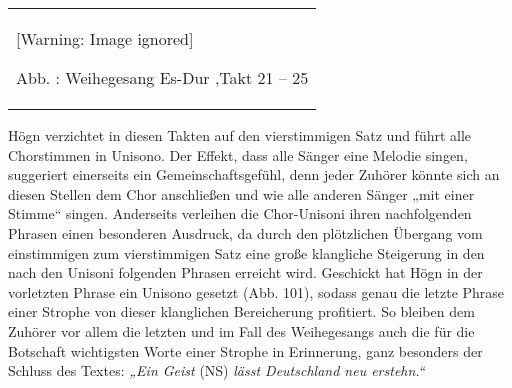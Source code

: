 \documentclass[a4paper]{article}
\newcommand\textstyleZitate[1]{\textit{#1}}
\newcounter{Abb}
\renewcommand\theAbb{\arabic{Abb}}
\begin{document}
\begin{center}
\tablefirsthead{}
\tablehead{}
\tabletail{}
\tablelasttail{}
\begin{supertabular}{m{10.009cm}}
  [Warning: Image ignored] %
 
\label{bkm:Ref100248086}Abb. \stepcounter{Abb}{\theAbb}: Weihegesang
Es-Dur ,Takt 21 – 25\\
\end{supertabular}
\end{center}
Högn verzichtet in diesen Takten auf den vierstimmigen Satz und führt
alle Chorstimmen in Unisono. Der Effekt, dass alle Sänger eine Melodie
singen, suggeriert einerseits ein Gemeinschaftsgefühl, denn jeder
Zuhörer könnte sich an diesen Stellen dem Chor anschließen und wie alle
anderen Sänger „mit einer Stimme“ singen. Anderseits verleihen die
Chor-Unisoni ihren nachfolgenden Phrasen einen besonderen Ausdruck, da
durch den plötzlichen Übergang vom einstimmigen zum vierstimmigen Satz
eine große klangliche Steigerung in den nach den Unisoni folgenden
Phrasen erreicht wird. Geschickt hat Högn in der vorletzten Phrase ein
Unisono gesetzt (Abb. 101), sodass genau die letzte Phrase einer
Strophe von dieser klanglichen Bereicherung profitiert. So bleiben dem
Zuhörer vor allem die letzten und im Fall des Weihegesangs auch die für
die Botschaft wichtigsten Worte einer Strophe in Erinnerung, ganz
besonders der Schluss des Textes: \textstyleZitate{„Ein Geist
}(NS)\textstyleZitate{ lässt Deutschland neu erstehn.“}
\end{document}
